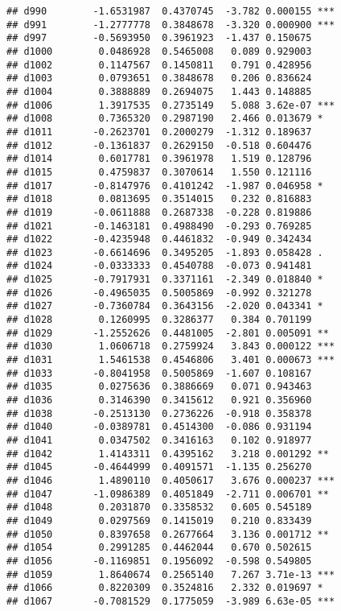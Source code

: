 \documentclass[
]{article}
\begin{document}
\begin{verbatim}
## d990        -1.6531987  0.4370745  -3.782 0.000155 ***
## d991        -1.2777778  0.3848678  -3.320 0.000900 ***
## d997        -0.5693950  0.3961923  -1.437 0.150675    
## d1000        0.0486928  0.5465008   0.089 0.929003    
## d1002        0.1147567  0.1450811   0.791 0.428956    
## d1003        0.0793651  0.3848678   0.206 0.836624    
## d1004        0.3888889  0.2694075   1.443 0.148885    
## d1006        1.3917535  0.2735149   5.088 3.62e-07 ***
## d1008        0.7365320  0.2987190   2.466 0.013679 *  
## d1011       -0.2623701  0.2000279  -1.312 0.189637    
## d1012       -0.1361837  0.2629150  -0.518 0.604476    
## d1014        0.6017781  0.3961978   1.519 0.128796    
## d1015        0.4759837  0.3070614   1.550 0.121116    
## d1017       -0.8147976  0.4101242  -1.987 0.046958 *  
## d1018        0.0813695  0.3514015   0.232 0.816883    
## d1019       -0.0611888  0.2687338  -0.228 0.819886    
## d1021       -0.1463181  0.4988490  -0.293 0.769285    
## d1022       -0.4235948  0.4461832  -0.949 0.342434    
## d1023       -0.6614696  0.3495205  -1.893 0.058428 .  
## d1024       -0.0333333  0.4540788  -0.073 0.941481    
## d1025       -0.7917931  0.3371161  -2.349 0.018840 *  
## d1026       -0.4965035  0.5005869  -0.992 0.321278    
## d1027       -0.7360784  0.3643156  -2.020 0.043341 *  
## d1028        0.1260995  0.3286377   0.384 0.701199    
## d1029       -1.2552626  0.4481005  -2.801 0.005091 ** 
## d1030        1.0606718  0.2759924   3.843 0.000122 ***
## d1031        1.5461538  0.4546806   3.401 0.000673 ***
## d1033       -0.8041958  0.5005869  -1.607 0.108167    
## d1035        0.0275636  0.3886669   0.071 0.943463    
## d1036        0.3146390  0.3415612   0.921 0.356960    
## d1038       -0.2513130  0.2736226  -0.918 0.358378    
## d1040       -0.0389781  0.4514300  -0.086 0.931194    
## d1041        0.0347502  0.3416163   0.102 0.918977    
## d1042        1.4143311  0.4395162   3.218 0.001292 ** 
## d1045       -0.4644999  0.4091571  -1.135 0.256270    
## d1046        1.4890110  0.4050617   3.676 0.000237 ***
## d1047       -1.0986389  0.4051849  -2.711 0.006701 ** 
## d1048        0.2031870  0.3358532   0.605 0.545189    
## d1049        0.0297569  0.1415019   0.210 0.833439    
## d1050        0.8397658  0.2677664   3.136 0.001712 ** 
## d1054        0.2991285  0.4462044   0.670 0.502615    
## d1056       -0.1169851  0.1956092  -0.598 0.549805    
## d1059        1.8640674  0.2565140   7.267 3.71e-13 ***
## d1066        0.8220309  0.3524816   2.332 0.019697 *  
## d1067       -0.7081529  0.1775059  -3.989 6.63e-05 ***

\end{verbatim}
\end{document}
